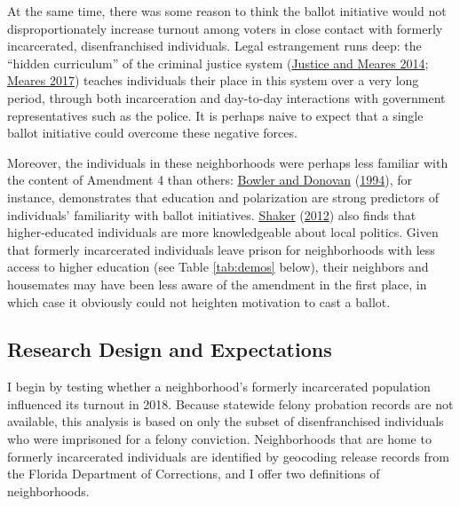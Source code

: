\documentclass[
  12pt,
]{article}
\begin{document}
At the same time, there was some reason to think the ballot initiative would not disproportionately increase turnout among voters in close contact with formerly incarcerated, disenfranchised individuals. Legal estrangement runs deep: the ``hidden curriculum'' of the criminal justice system (\protect\hyperlink{ref-Justice2014}{Justice and Meares 2014}; \protect\hyperlink{ref-Meares2017}{Meares 2017}) teaches individuals their place in this system over a very long period, through both incarceration and day-to-day interactions with government representatives such as the police. It is perhaps naive to expect that a single ballot initiative could overcome these negative forces.

Moreover, the individuals in these neighborhoods were perhaps less familiar with the content of Amendment 4 than others: \protect\hyperlink{ref-Bowler1994}{Bowler and Donovan} (\protect\hyperlink{ref-Bowler1994}{1994}), for instance, demonstrates that education and polarization are strong predictors of individuals' familiarity with ballot initiatives. \protect\hyperlink{ref-Shaker2012}{Shaker} (\protect\hyperlink{ref-Shaker2012}{2012}) also finds that higher-educated individuals are more knowledgeable about local politics. Given that formerly incarcerated individuals leave prison for neighborhoods with less access to higher education (see Table \ref{tab:demos} below), their neighbors and housemates may have been less aware of the amendment in the first place, in which case it obviously could not heighten motivation to cast a ballot.

\hypertarget{research-design-and-expectations}{%
\subsection*{Research Design and Expectations}\label{research-design-and-expectations}}

I begin by testing whether a neighborhood's formerly incarcerated population influenced its turnout in 2018. Because statewide felony probation records are not available, this analysis is based on only the subset of disenfranchised individuals who were imprisoned for a felony conviction. Neighborhoods that are home to formerly incarcerated individuals are identified by geocoding release records from the Florida Department of Corrections, and I offer two definitions of neighborhoods.
\end{document}
